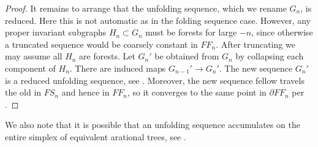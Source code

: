 \documentclass[11pt, letterpaper]{amsart}
\theoremstyle{plain}
\theoremstyle{definition}
\begin{document}
\begin{proof}
  It remains to arrange that the unfolding sequence, which we rename $G_n$, is reduced. Here this is not
  automatic as in the folding sequence case. However, any proper invariant
  subgraphs $H_n\subset G_n$ must be forests for large $-n$, since
  otherwise a truncated sequence would be coarsely constant in
  $FF_n$. After truncating we may assume all $H_n$ are forests. Let
  $G_n'$ be obtained from $G_n$ by collapsing each component of
  $H_n$. There are induced maps $G_{n-1}'\to G_n'$. The new sequence
  $G_n'$ is a reduced unfolding sequence, see \cite[Lemma
    4.1]{handel-mosher:FSishyperbolic}. Moreover, the new sequence
  fellow travels the old in $FS_n$ and hence in $FF_n$, so it
  converges to the same point in $\partial FF_n$ per .
\end{proof}

We also note that it is possible that an unfolding sequence
accumulates on the entire simplex of equivalent arational trees, see
\cite{bestvina2024limit}.
\end{document}
